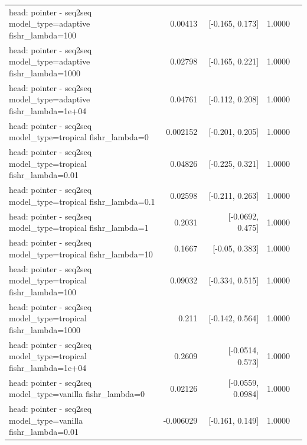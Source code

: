 \documentclass[10pt]{article}
\makeatletter
\newcommand{\stackcell}[1]{\begin{tabular}[t]{@{}l@{}}#1\end{tabular}}
\makeatother
\begin{document}
{\begin{longtable}{lrrrl}
\stackcell{head: pointer - seq2seq\\\footnotesize model\_type=adaptive fishr\_lambda=100 } & 0.00413 & [-0.165, 0.173] & 1.0000 & \\
\stackcell{head: pointer - seq2seq\\\footnotesize model\_type=adaptive fishr\_lambda=1000 } & 0.02798 & [-0.165, 0.221] & 1.0000 & \\
\stackcell{head: pointer - seq2seq\\\footnotesize model\_type=adaptive fishr\_lambda=1e+04 } & 0.04761 & [-0.112, 0.208] & 1.0000 & \\
\stackcell{head: pointer - seq2seq\\\footnotesize model\_type=tropical fishr\_lambda=0 } & 0.002152 & [-0.201, 0.205] & 1.0000 & \\
\stackcell{head: pointer - seq2seq\\\footnotesize model\_type=tropical fishr\_lambda=0.01 } & 0.04826 & [-0.225, 0.321] & 1.0000 & \\
\stackcell{head: pointer - seq2seq\\\footnotesize model\_type=tropical fishr\_lambda=0.1 } & 0.02598 & [-0.211, 0.263] & 1.0000 & \\
\stackcell{head: pointer - seq2seq\\\footnotesize model\_type=tropical fishr\_lambda=1 } & 0.2031 & [-0.0692, 0.475] & 1.0000 & \\
\stackcell{head: pointer - seq2seq\\\footnotesize model\_type=tropical fishr\_lambda=10 } & 0.1667 & [-0.05, 0.383] & 1.0000 & \\
\stackcell{head: pointer - seq2seq\\\footnotesize model\_type=tropical fishr\_lambda=100 } & 0.09032 & [-0.334, 0.515] & 1.0000 & \\
\stackcell{head: pointer - seq2seq\\\footnotesize model\_type=tropical fishr\_lambda=1000 } & 0.211 & [-0.142, 0.564] & 1.0000 & \\
\stackcell{head: pointer - seq2seq\\\footnotesize model\_type=tropical fishr\_lambda=1e+04 } & 0.2609 & [-0.0514, 0.573] & 1.0000 & \\
\stackcell{head: pointer - seq2seq\\\footnotesize model\_type=vanilla fishr\_lambda=0 } & 0.02126 & [-0.0559, 0.0984] & 1.0000 & \\
\stackcell{head: pointer - seq2seq\\\footnotesize model\_type=vanilla fishr\_lambda=0.01 } & -0.006029 & [-0.161, 0.149] & 1.0000 & \\

\end{longtable}}
\end{document}
